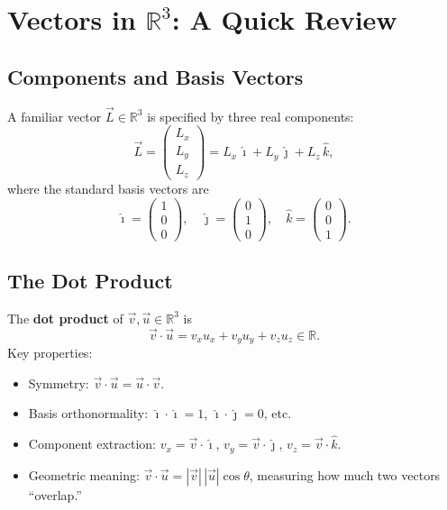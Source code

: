 \documentclass[11pt,a4paper]{article}
\theoremstyle{definition}
\theoremstyle{plain}
\theoremstyle{remark}
\begin{document}
\section{Vectors in $\mathbb{R}^3$: A Quick Review}

\subsection{Components and Basis Vectors}

A familiar vector $\vec{L} \in \mathbb{R}^3$ is specified by three real components:
\[
    \vec{L} = \begin{pmatrix} L_x \\ L_y \\ L_z \end{pmatrix} = L_x\,\hat{\imath} + L_y\,\hat{\jmath} + L_z\,\hat{k},
\]
where the standard basis vectors are
\[
    \hat{\imath} = \begin{pmatrix}1\\0\\0\end{pmatrix}, \quad
    \hat{\jmath} = \begin{pmatrix}0\\1\\0\end{pmatrix}, \quad
    \hat{k} = \begin{pmatrix}0\\0\\1\end{pmatrix}.
\]

\subsection{The Dot Product}

The \textbf{dot product} of $\vec{v}, \vec{u} \in \mathbb{R}^3$ is
\[
    \vec{v} \cdot \vec{u} = v_x u_x + v_y u_y + v_z u_z \in \mathbb{R}.
\]
Key properties:
\begin{itemize}
    \item Symmetry: $\vec{v} \cdot \vec{u} = \vec{u} \cdot \vec{v}$.
    \item Basis orthonormality: $\hat{\imath} \cdot \hat{\imath} = 1$, $\hat{\imath} \cdot \hat{\jmath} = 0$, etc.
    \item Component extraction: $v_x = \vec{v} \cdot \hat{\imath}$, $v_y = \vec{v} \cdot \hat{\jmath}$, $v_z = \vec{v} \cdot \hat{k}$.
    \item Geometric meaning: $\vec{v} \cdot \vec{u} = |\vec{v}|\,|\vec{u}|\cos\theta$, measuring how much two vectors ``overlap.''
\end{itemize}
\end{document}
